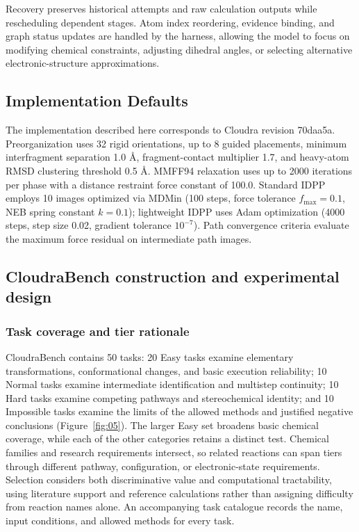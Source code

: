 Recovery preserves historical attempts and raw calculation outputs while rescheduling dependent stages. Atom index reordering, evidence binding, and graph status updates are handled by the harness, allowing the model to focus on modifying chemical constraints, adjusting dihedral angles, or selecting alternative electronic-structure approximations.



\subsection{Implementation Defaults}
{\small
The implementation described here corresponds to Cloudra revision 70daa5a. Preorganization uses 32 rigid orientations, up to 8 guided placements, minimum interfragment separation 1.0 Å, fragment-contact multiplier 1.7, and heavy-atom RMSD clustering threshold 0.5 Å. MMFF94 relaxation uses up to 2000 iterations per phase with a distance restraint force constant of 100.0. Standard IDPP employs 10 images optimized via MDMin (100 steps, force tolerance $f_{\max}=0.1$, NEB spring constant $k=0.1$); lightweight IDPP uses Adam optimization (4000 steps, step size 0.02, gradient tolerance $10^{-7}$). Path convergence criteria evaluate the maximum force residual on intermediate path images.\par}

\subsection{CloudraBench construction and experimental design}

\subsubsection{Task coverage and tier rationale}



CloudraBench contains 50 tasks: 20 Easy tasks examine elementary transformations, conformational changes, and basic execution reliability; 10 Normal tasks examine intermediate identification and multistep continuity; 10 Hard tasks examine competing pathways and stereochemical identity; and 10 Impossible tasks examine the limits of the allowed methods and justified negative conclusions (Figure~\ref{fig:05}). The larger Easy set broadens basic chemical coverage, while each of the other categories retains a distinct test. Chemical families and research requirements intersect, so related reactions can span tiers through different pathway, configuration, or electronic-state requirements. Selection considers both discriminative value and computational tractability, using literature support and reference calculations rather than assigning difficulty from reaction names alone. An accompanying task catalogue records the name, input conditions, and allowed methods for every task.

